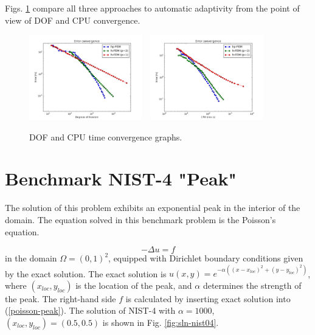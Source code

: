 \documentclass[12pt]{elsarticle}
\begin{document}
Figs. \ref{fig:nist-3-conv} compare all
three approaches to automatic adaptivity from the point
of view of DOF and CPU convergence.

\begin{figure}[H]
\centering
\vspace{-5mm}
\includegraphics[height=3.7cm]{nist/nist-3/conv_dof_aniso.png}\ \
\includegraphics[height=3.7cm]{nist/nist-3/conv_cpu_aniso.png}
\vspace{-5mm}
\caption{DOF and CPU time convergence graphs.}
\vspace{-5mm}
\label{fig:nist-3-conv}
\end{figure}


\section{Benchmark NIST-4 "Peak"}
\label{sec:bench-4}

The solution of this problem exhibits an exponential peak in the interior of the domain.
The equation solved in this benchmark problem is the Poisson's equation.

\begin{equation} \label{poisson-peak}
-\Delta u = f
\end{equation}
in the domain $\Omega = (0, 1)^2$, equipped with Dirichlet
boundary conditions given by the exact solution.
The exact solution is
$u(x,y) = e^{-\alpha ((x - x_{loc})^{2} + (y - y_{loc})^{2})}$,
where $(x_{loc}, y_{loc})$ is the location of the peak,
and $\alpha$ determines the strength of the peak.
The right-hand side $f$ is calculated by inserting exact solution into (\ref{poisson-peak}).
The solution of NIST-4 with $\alpha = 1000$,
$(x_{loc}, y_{loc}) = (0.5, 0.5)$ is shown in Fig. \ref{fig:sln-nist04}.
\end{document}
